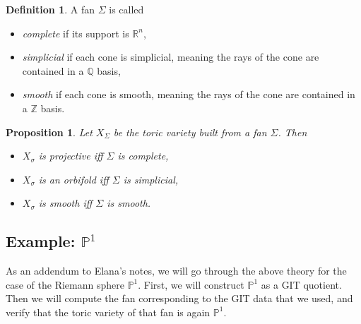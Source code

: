 \documentclass{article}
\newtheorem{prop}[theorem]{Proposition}
\theoremstyle{definition}
\newtheorem{definition}[theorem]{Definition}
\theoremstyle{remark}
\numberwithin{theorem}{section}
\newcommand{\bP}{\mathbb{P}}
\newenvironment{defn}{
	\begin{mdframed}
		\vspace{-0.5em}
		\begin{definition}
		}{
		\end{definition}
	\end{mdframed}
}
\begin{document}
	\begin{defn}
		A fan $\Sigma$ is called
		\begin{itemize}
			\item \emph{complete} if its support is $\mathbb{R}^n$,
			\item \emph{simplicial} if each cone is simplicial, meaning the rays of the cone are contained in a $\mathbb{Q}$ basis,
			\item \emph{smooth} if each cone is smooth, meaning the rays of the cone are contained in a $\mathbb{Z}$ basis.
		\end{itemize}
	\end{defn}
	\begin{prop}
		Let $X_\Sigma$ be the toric variety built from a fan $\Sigma$. Then
		\begin{itemize}
			\item $X_\sigma$ is projective iff $\Sigma$ is complete,
			\item $X_\sigma$ is an orbifold iff $\Sigma$ is simplicial,
			\item $X_\sigma$ is smooth iff $\Sigma$ is smooth.
		\end{itemize}
	\end{prop}

	\subsection{Example: $\bP^1$}
	As an addendum to Elana's notes, we will go through the above theory for the case of the Riemann sphere $\bP^1$. First, we will construct $\bP^1$ as a GIT quotient. Then we will compute the fan corresponding to the GIT data that we used, and verify that the toric variety of that fan is again $\bP^1$. \vspace*{1em}
\end{document}
